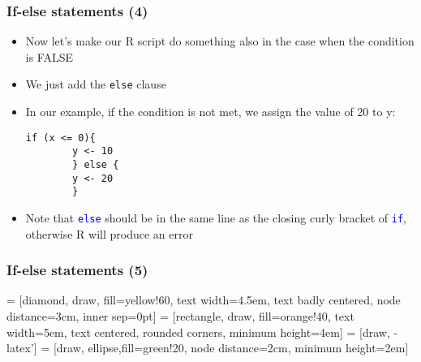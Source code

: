 \documentclass[10pt]{beamer}
\newcommand{\cc}[1]{\texttt{\textcolor{blue}{#1}}}
\theoremstyle{definition}
\begin{document}
\begin{frame}[fragile]
\frametitle{If-else statements (4)}
\begin{itemize}
	\item Now let's make our R script do something also in the case when the condition is FALSE
	\item We just add the \texttt{else} clause
	\item In our example, if the condition is not met, we assign the value of 20 to y:
	\begin{lstlisting}[style = rstyle, breaklines]
	if (x <= 0){
		y <- 10
		} else {
		y <- 20
		}
	\end{lstlisting}
	\item Note that \cc{else} should be in the same line as the closing curly bracket of \cc{if}, otherwise R will produce an error
\end{itemize}
\end{frame}

\begin{frame}[fragile]
\frametitle{If-else statements (5)}
 = [diamond, draw, fill=yellow!60, 
    text width=4.5em, text badly centered, node distance=3cm, inner sep=0pt]
 = [rectangle, draw, fill=orange!40, 
    text width=5em, text centered, rounded corners, minimum height=4em]
 = [draw, -latex']
 = [draw, ellipse,fill=green!20, node distance=2cm,
    minimum height=2em]

\begin{center}
\end{center} 
\end{frame}
\end{document}
